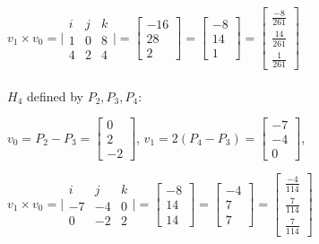 \documentclass{article}
\begin{document}
\begin{enumerate}
        $ v_1 \times  v_0  = \Bigg | \begin{matrix}
            i & j & k \\
            1 & 0 & 8 \\
            4 & 2 & 4
        \end{matrix} \Bigg | = \begin{bmatrix} -16 \\ 28 \\ 2 \end{bmatrix} = \begin{bmatrix} -8 \\ 14 \\ 1 \end{bmatrix}  = \begin{bmatrix} \frac{-8}{261} \\ \frac{14}{261} \\ \frac{1}{261}  \end{bmatrix} $

        \paragraph{} $H_4$ defined by $P_2,P_3,P_4$:

        $v_0 = P_2 - P_3 = \begin{bmatrix} 0 \\ 2 \\ -2 \end{bmatrix}$,
        $v_1 = 2(P_4 - P_3) = \begin{bmatrix} -7  \\ -4 \\ 0 \end{bmatrix}$,

        $ v_1 \times v_0  = \Bigg | \begin{matrix}
            i & j & k \\
            -7 & -4 & 0 \\
            0 & -2 & 2
        \end{matrix} \Bigg | = \begin{bmatrix} -8 \\ 14 \\ 14 \end{bmatrix} = \begin{bmatrix} -4 \\ 7 \\ 7 \end{bmatrix}  = \begin{bmatrix} \frac{-4}{114} \\ \frac{7}{114} \\ \frac{7}{114} \end{bmatrix} $


\end{enumerate}
\end{document}
